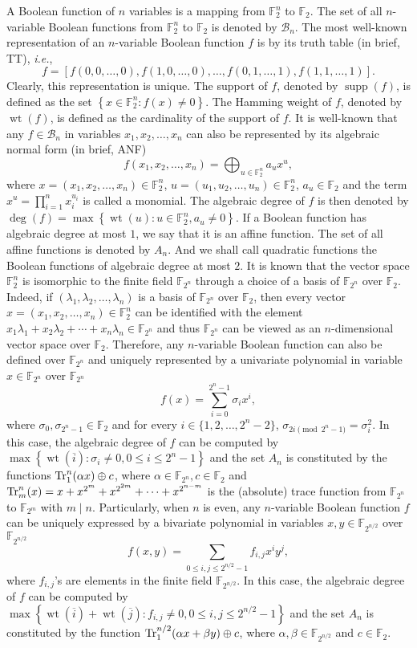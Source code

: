 \documentclass{article}
\newcommand{\F}{\mathbb{F}}
\newcommand{\0}{\textbf{0}}
\newcommand{\1}{\textbf{1}}
\newcommand{\wt}{\operatorname{wt}}
\theoremstyle{plain}
\begin{document}
    A Boolean function of $n$ variables is a mapping from $\F_2^n$ to $\F_2$.
    The set of all $n$-variable Boolean functions from $\F_2^n$ to $\F_2$ is denoted by $\mathcal{B}_n$.
    The most well-known representation of an $n$-variable Boolean function $f$ is by its truth table (in brief, TT), \emph{i.e.},
    \[f=\left[ f(0,0,\dots,0),f(1,0,\dots,0),\dots,f(0,1,\dots,1),f(1,1,\dots,1) \right].\]
    Clearly, this representation is unique.
    The support of $f$, denoted by $\operatorname{supp}(f)$, is defined as the set $\left\{ x\in\F_2^n : f(x)\ne 0 \right\}$.
    The Hamming weight of $f$, denoted by $\wt(f)$, is defined as the cardinality of the support of $f$.
    It is well-known that any $f\in\mathcal{B}_n$ in variables $x_1,x_2,\dots,x_n$ can also be represented by its algebraic normal form (in brief, ANF)
    \[f(x_1,x_2,\dots,x_n) = \bigoplus_{u\in\F_2^n}a_ux^u,\]
    where $x=(x_1,x_2,\dots,x_n)\in\F_2^n$, $u=(u_1,u_2,\dots,u_n)\in\F_2^n$, $a_u\in\F_2$ and the term $x^{u}=\prod_{i=1}^nx_i^{u_i}$ is called a monomial.
    The algebraic degree of $f$ is then denoted by $\deg(f)=\max\left\{ \wt(u) :  u\in\F_2^n, a_u\ne 0 \right\}$.
    If a Boolean function has algebraic degree at most $1$, we say that it is an affine function.
    The set of all affine functions is denoted by $A_n$.
    And we shall call quadratic functions the Boolean functions of algebraic degree at most $2$.
    It is known that the vector space $\F_2^n$ is isomorphic to the finite field $\F_{2^n}$ through a choice of a basis of $\F_{2^n}$ over $\F_2$.
    Indeed, if $(\lambda_1,\lambda_2,\dots,\lambda_n)$ is a basis of $\F_{2^n}$ over $\F_2$, then every vector $x=(x_1,x_2,\dots,x_n)\in\F_2^n$ can be
    identified with the element $x_1\lambda_1+x_2\lambda_2+\cdots+x_n\lambda_n\in\F_{2^n}$ and thus $\F_{2^n}$ can be viewed as an $n$-dimensional vector space over $\F_2$.
    Therefore, any $n$-variable Boolean function can also be defined over $\F_{2^n}$ and uniquely represented by a univariate polynomial in variable $x\in\F_{2^n}$ over $\F_{2^n}$
    \[f(x) = \sum_{i=0}^{2^n-1}\sigma_ix^i,\]
    where $\sigma_0,\sigma_{2^n-1}\in\F_2$ and for every $i\in\{1,2,\dots,2^n-2\}$, $\sigma_{2i\pmod{2^n-1}}=\sigma_i^2$.
    In this case, the algebraic degree of $f$ can be computed by $\max\left\{ \wt(\overline{i}) : \sigma_i\ne 0, 0\le i\le 2^n-1 \right\}$ and the set $A_n$ is constituted by the functions $\Tr_1^n(\alpha x)\oplus c$, where $\alpha\in\F_{2^n}, c\in\F_2$ and $ \Tr_m^n(x)=x+x^{2^m}+x^{2^{2m}}+\cdots+x^{2^{n-m}}$ is the (absolute) trace function from $\F_{2^n}$ to $\F_{2^m}$ with $m\mid n$.
    Particularly, when $n$ is even, any $n$-variable Boolean function $f$ can be uniquely expressed by a bivariate polynomial in variables $x,y\in\F_{2^{n/2}}$ over $\F_{2^{n/2}}$
    \[f(x,y)=\sum_{0\le i,j\le 2^{n/2}-1}f_{i,j}x^iy^j,\]
    where $f_{i,j}$'s are elements in the finite field $\F_{2^{n/2}}$.
    In this case, the algebraic degree of $f$ can be computed by $\max\left\{ \wt(\overline{i})+\wt(\overline{j}) : f_{i,j}\ne 0, 0\le i,j\le 2^{n/2}-1 \right\}$ and the set $A_n$ is constituted by the function $\Tr_1^{n/2}(\alpha x+\beta y)\oplus c$, where $\alpha,\beta\in\F_{2^{n/2}}$ and $c\in\F_2$.
\end{document}
